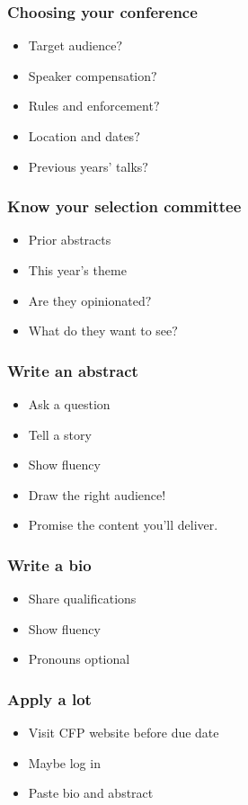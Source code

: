 \documentclass{beamer}
\begin{document}
\begin{frame}[fragile]
\frametitle{Choosing your conference}
\begin{itemize}[<+(1)->]
\item Target audience$?$
\item Speaker compensation$?$
\item Rules and enforcement$?$
\item Location and dates$?$
\item Previous years' talks$?$
\end{itemize}
\end{frame}

\begin{frame}[fragile]
\frametitle{Know your selection committee}
\begin{itemize}[<+(1)->]
\item Prior abstracts
\item This year's theme
\item Are they opinionated$?$
\item What do they want to see$?$
\end{itemize}
\end{frame}

\begin{frame}[fragile]
\frametitle{Write an abstract}
\begin{itemize}[<+(1)->]
\item Ask a question
\item Tell a story
\item Show fluency
\item Draw the right audience!
\item Promise the content you'll deliver.
\end{itemize}
\end{frame}

\begin{frame}[fragile]
\frametitle{Write a bio}
\begin{itemize}[<+(1)->]
\item Share qualifications
\item Show fluency
\item Pronouns optional
\end{itemize}
\end{frame}

\begin{frame}[fragile]
\frametitle{Apply a lot}
\begin{itemize}[<+(1)->]
\item Visit CFP website before due date
\item Maybe log in
\item Paste bio and abstract
\end{itemize}
\end{frame}
\end{document}
